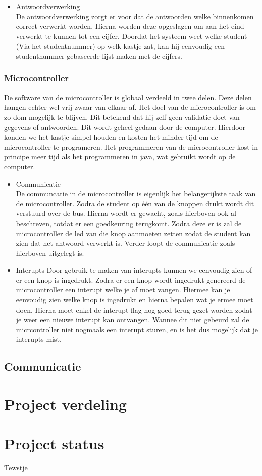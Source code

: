 \documentclass[a4paper,titlepage]{artikel1}
\begin{document}
\begin{itemize}
  \item Antwoordverwerking \\
    De antwoordverwerking zorgt er voor dat de antwoorden welke binnenkomen correct verwerkt worden. Hierna worden deze opgeslagen om aan het eind verwerkt te kunnen tot een cijfer. Doordat het systeem weet welke student (Via het studentnummer) op welk kastje zat, kan hij eenvoudig een studentnummer gebaseerde lijst maken met de cijfers. 
\end{itemize}
\subsubsection{Microcontroller}
De software van de microcontroller is globaal verdeeld in twee delen. Deze delen hangen echter wel vrij zwaar van elkaar af. Het doel van de microcontroller is om zo dom mogelijk te blijven. Dit betekend dat hij zelf geen validatie doet van gegevens of antwoorden. Dit wordt geheel gedaan door de computer. Hierdoor konden we het kastje simpel houden en kosten het minder tijd om de microcontroller te programeren. Het programmeren van de microcontroller kost in principe meer tijd als het programmeren in java, wat gebruikt wordt op de computer.
\begin{itemize}
  \item Communicatie\\
    De communcatie in de microcontroller is eigenlijk het belangerijkste taak van de microcontroller. Zodra de student op één van de knoppen drukt wordt dit verstuurd over de bus. Hierna wordt er gewacht, zoals hierboven ook al beschreven, totdat er een goedkeuring terugkomt. Zodra deze er is zal de microcontroller de led van die knop aanmoeten zetten zodat de student kan zien dat het antwoord verwerkt is. Verder loopt de communicatie zoals hierboven uitgelegt is.
  \item Interupts
    Door gebruik te maken van interupts kunnen we eenvoudig zien of er een knop is ingedrukt. Zodra er een knop wordt ingedrukt genereerd de microcontroller een interupt welke je af moet vangen. Hiermee kan je eenvoudig zien welke knop is ingedrukt en hierna bepalen wat je ermee moet doen. Hierna moet enkel de interupt flag nog goed terug gezet worden zodat je weer een nieuwe interupt kan ontvangen. Wannee dit niet gebeurd zal de micrcontroller niet nogmaals een interupt sturen, en is het dus mogelijk dat je interupts mist.
\end{itemize}
\subsection{Communicatie}
\section{Project verdeling}

\section{Project status}

\begin{thebibliography}{xxxxx}
Tewstje
\end{thebibliography}
\end{document}
